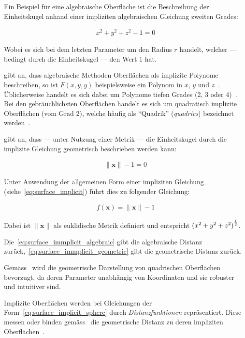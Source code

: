 Ein Beispiel für eine algebraische Oberfläche ist die Beschreibung der
Einheitskugel anhand einer impliziten algebraischen Gleichung zweiten Grades:

\begin{gather} \label{eq:surface_immplicit_algebraic}
    x^{2} + y^{2} + z^{2} - 1 = 0
\end{gather}

Wobei es sich bei dem letzten Parameter um den Radius $r$ handelt, welcher ---
bedingt durch die Einheitskugel --- den Wert 1 hat.

\citeauthor{menon_introduction_1996} gibt an, dass algebraische Methoden
Oberflächen als implizite Polynome beschreiben, so ist $F(x, y, y)$
beispielsweise ein Polynom in $x$, $y$ und $z$~\parencite[S.
2]{menon_introduction_1996}. Üblicherweise handelt es sich dabei um
Polynome tiefen Grades (2, 3 oder 4)~\parencite[S.
2]{menon_introduction_1996}. Bei den gebräuchlichsten Oberflächen
handelt es sich um quadratisch implizite Oberflächen (vom Grad 2),
welche häufig als ``Quadrik'' (\textit{quadrics}) bezeichnet
werden~\parencite[S.  2]{menon_introduction_1996}.

\citeauthor{hart_sphere_1994} gibt an, dass --- unter Nutzung einer Metrik ---
die Einheitskugel durch die implizite Gleichung geometrisch beschrieben
werden kann:

\begin{gather}\label{eq:surface_immplicit_geometric}
    \|\bm{x}\| - 1 = 0
\end{gather}

Unter Anwendung der allgemeinen Form einer impliziten Gleichung
(siehe~\ref{eq:surface_implicit}) führt dies zu folgender Gleichung:

\begin{gather}\label{eq:surface_implicit_sphere}
    f(\bm{x}) = \|\bm{x}\| - 1
\end{gather}


Dabei ist $\|\bm{x}\|$ als euklidische Metrik definiert und entspricht
${(x^{2} + y^{2} + z^{2})}^{1 \over 2}$.

Die~\autoref{eq:surface_immplicit_algebraic} gibt die algebraische
Distanz zurück,~\autoref{eq:surface_immplicit_geometric} gibt die
geometrische Distanz zurück.

Gemäss~\citeauthor{hart_sphere_1994} wird die geometrische Darstellung
von quadrischen Oberflächen bevorzugt, da deren Parameter unabhängig von
Koordinaten und sie robuster und intuitiver sind.

Implizite Oberflächen werden bei Gleichungen der
Form~\ref{eq:surface_implicit_sphere} durch \textit{Distanzfunktionen}
repräsentiert. Diese messen oder binden
gemäss~\citeauthor{hart_sphere_1994} die geometrische Distanz zu deren
impliziten Oberflächen~\parencite[S. 529]{hart_sphere_1994}.

